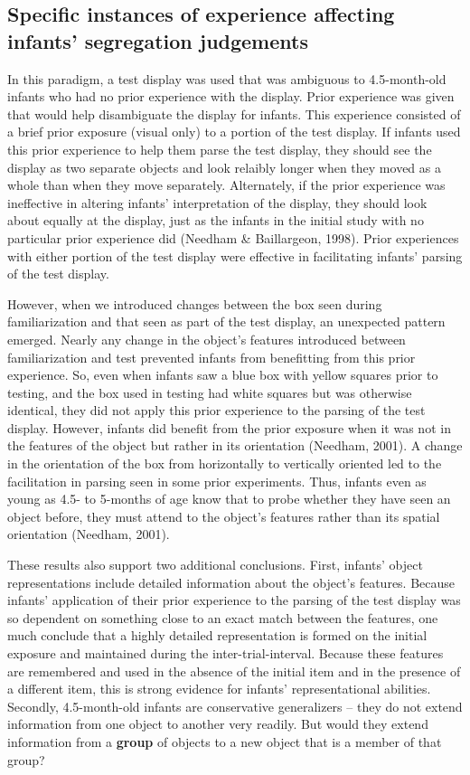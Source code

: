 \subsection{Specific instances of experience affecting infants' segregation judgements}

In this paradigm, a test display was used that was ambiguous to
4.5-month-old infants who had no prior experience with the display.
Prior experience was given that would help disambiguate the display
for infants.  This experience consisted of a brief prior exposure
(visual only) to a portion of the test display.  If infants used this
prior experience to help them parse the test display, they should see
the display as two separate objects and look relaibly longer when they
moved as a whole than when they move separately.  Alternately, if the
prior experience was ineffective in altering infants'
interpretation of the display, they should look about equally at the
display, just as the infants in the initial study with no particular
prior experience did (Needham \& Baillargeon, 1998).  Prior experiences
with either portion of the test display were effective in facilitating
infants' parsing of the test display.  

However, when we introduced changes between the box seen during
familiarization and that seen as part of the test display, an
unexpected pattern emerged.  Nearly any change in the object's
features introduced between familiarization and test prevented infants
from benefitting from this prior experience.  So, even when infants
saw a blue box with yellow squares prior to testing, and the box used
in testing had white squares but was otherwise identical, they did not
apply this prior experience to the parsing of the test display.
However, infants did benefit from the prior exposure when it was not
in the features of the object but rather in its orientation (Needham,
2001).  A change in the orientation of the box from horizontally to
vertically oriented led to the facilitation in parsing seen in some
prior experiments.  Thus, infants even as young as 4.5- to 5-months of
age know that to probe whether they have seen an object before, they
must attend to the object's features rather than its spatial
orientation (Needham, 2001).

These results also support two additional conclusions.  First,
infants' object representations include detailed information
about the object's features.  Because infants'
application of their prior experience to the parsing of the test
display was so dependent on something close to an exact match between
the features, one much conclude that a highly detailed representation
is formed on the initial exposure and maintained during the
inter-trial-interval.  Because these features are remembered and used
in the absence of the initial item and in the presence of a different
item, this is strong evidence for infants' representational
abilities.  Secondly, 4.5-month-old infants are conservative
generalizers -- they do not extend information from one object to
another very readily.  But would they extend information from a {\bf group}
of objects to a new object that is a member of that group?


